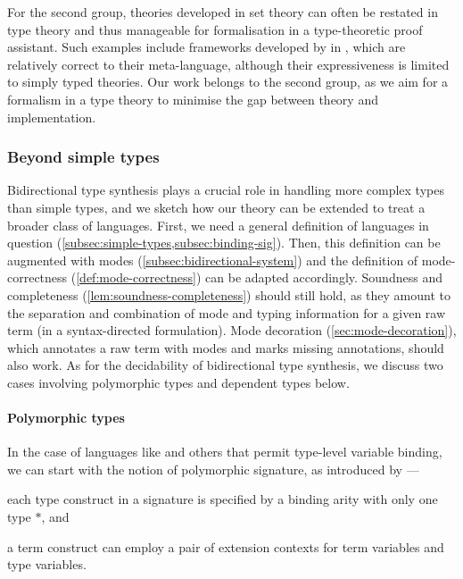 For the second group, theories developed in set theory can often be restated in type theory and thus manageable for formalisation in a type-theoretic proof assistant. 
Such examples include frameworks developed by \citet{Allais2021,Ahrens2022,Fiore2022} in \Agda, which are relatively correct to their meta-language, although their expressiveness is limited to simply typed theories.
Our work belongs to the second group, as we aim for a formalism in a type theory to minimise the gap between theory and implementation.

\subsubsection{Beyond simple types}

Bidirectional type synthesis plays a crucial role in handling more complex types than simple types, and we sketch how our theory can be extended to treat a broader class of languages.
First, we need a general definition of languages in question (\cref{subsec:simple-types,subsec:binding-sig}).
Then, this definition can be augmented with modes (\cref{subsec:bidirectional-system}) and the definition of mode-correctness (\cref{def:mode-correctness}) can be adapted accordingly.
Soundness and completeness (\cref{lem:soundness-completeness}) should still hold, as they amount to the separation and combination of mode and typing information for a given raw term (in a syntax-directed formulation).
Mode decoration (\cref{sec:mode-decoration}), which annotates a raw term with modes and marks missing annotations, should also work.
As for the decidability of bidirectional type synthesis, we discuss two cases involving polymorphic types and dependent types below.

\paragraph{Polymorphic types}
In the case of languages like \SystemF and others that permit type-level variable binding, we can start with the notion of polymorphic signature, as introduced by \citet{Hamana2011}---\begin{inlineenum}
  \item each type construct in a signature is specified by a binding arity with only one type $*$, and
  \item a term construct can employ a pair of extension contexts for term variables and type variables.
\end{inlineenum}

